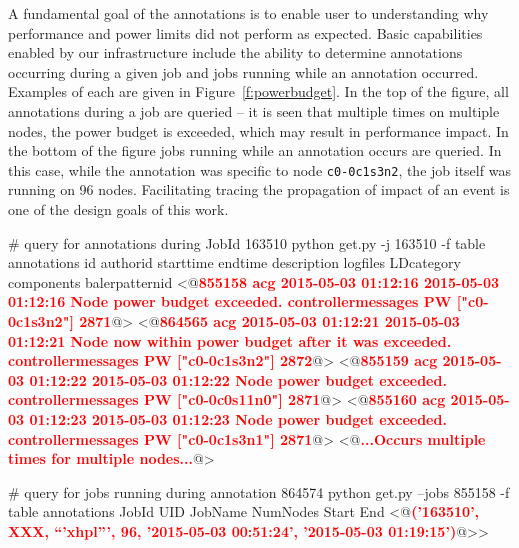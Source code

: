 A fundamental goal of the annotations is to enable user to understanding why performance and power limits did not perform as expected.
Basic capabilities enabled by our infrastructure include the ability to determine annotations occurring during a given job
and jobs running while an annotation occurred. Examples of each are given in Figure~\ref{f:powerbudget}.
In the top of the figure, all annotations during a job are queried -- it is seen that multiple times on multiple nodes, the
power budget is exceeded, which may result in performance impact. In the bottom of the figure jobs running while an annotation occurs are queried. In this case,
while the annotation was specific to node \texttt{c0-0c1s3n2}, the job itself was running on 96 nodes. Facilitating
tracing the propagation of impact of an event is one of the design goals of this work.

\begin{figure*}
\begin{annol}

# query for annotations during JobId 163510
python get.py -j 163510  -f table annotations
id	authorid	starttime	endtime		description	logfiles	LDcategory	components	balerpatternid
<@\textbf{\textcolor{red}{855158	acg	2015-05-03 01:12:16	2015-05-03 01:12:16	Node power budget exceeded.	controllermessages	PW	["c0-0c1s3n2"]	2871}}@>
<@\textbf{\textcolor{red}{864565	acg	2015-05-03 01:12:21	2015-05-03 01:12:21	Node now within power budget after it was exceeded.	controllermessages	PW	["c0-0c1s3n2"]	2872}}@>
<@\textbf{\textcolor{red}{855159	acg	2015-05-03 01:12:22	2015-05-03 01:12:22	Node power budget exceeded.	controllermessages	PW	["c0-0c0s11n0"]	2871}}@>
<@\textbf{\textcolor{red}{855160	acg	2015-05-03 01:12:23	2015-05-03 01:12:23	Node power budget exceeded.	controllermessages	PW	["c0-0c1s3n1"]	2871}}@>
<@\textbf{\textcolor{red}{...Occurs multiple times for multiple nodes...}}@>


# query for jobs running during annotation 864574
python get.py --jobs 855158 -f table annotations
JobId    UID    JobName    NumNodes    Start    End
<@\textbf{\textcolor{red}{('163510', XXX, ``'xhpl''', 96, '2015-05-03 00:51:24', '2015-05-03 01:19:15')}}@>>

\end{annol}
\caption{Annotations provide access to power state information in otherwise unavailable logs. Basic implementation
capabilities include discovery of annotations during a job (top) and and jobs running while an annotation occurred (bottom).}
\label{f:powerbudget}
\end{figure*}


